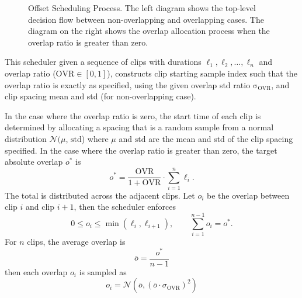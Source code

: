 \begin{figure}[ht]
\begin{minipage}[t]{0.48\linewidth}
{
}
\label{fig:overlap_allocation}
\end{minipage}
\caption{Offset Scheduling Process. The left diagram shows the top-level decision flow between non-overlapping and overlapping cases. The diagram on the right shows the overlap allocation process when the overlap ratio is greater than zero.}
\label{fig:offset_scheduling}
\end{figure}
This scheduler given a sequence of clips with durations $\ell_1, \ell_2,\dots, \ell_n$ and overlap ratio ($\mathrm{OVR} \in [0,1]$), constructs clip starting sample index such that the overlap ratio is exactly as specified, using the given overlap std ratio $\mathrm{\sigma_\mathrm{OVR}}$, and clip spacing mean and std (for non-overlapping case).

In the case where the overlap ratio is zero, the start time of each clip is determined by allocating a spacing that is a random sample from a normal distribution $\mathcal{N}(\mu$, $\mathrm{std}$) where $\mu$ and $\mathrm{std}$ are the mean and std of the clip spacing specified.
In the case where the overlap ratio is greater than zero, the target absolute overlap $o^*$ is
\begin{equation}
o^* = \frac{\mathrm{OVR}}{1+\mathrm{OVR}} \cdot \sum_{i=1}^n \ell_i.
\end{equation}
The total is distributed across the adjacent clips. Let $o_i$ be the overlap between clip $i$ and clip $i+1$, then the scheduler enforces
\begin{equation}
0\le o_i\le \min(\ell_i, \ell_{i+1}), \qquad \sum_{i=1}^{n-1} o_i=o^*.
\end{equation}
For $n$ clips, the average overlap is
\begin{equation}
\bar{o} = \frac{o^*}{n-1}
\end{equation}
then each overlap $o_i$ is sampled as
\begin{equation}
o_i=\mathcal{N}(\bar{o}, (\bar{o} \cdot \sigma_\mathrm{OVR})^2)
\end{equation}

